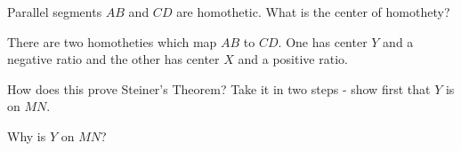 








Parallel segments $AB$ and $CD$ are homothetic. What is the center of homothety?








There are two homotheties which map $AB$ to $CD$. One has center $Y$ and a negative ratio and the other has center $X$ and a positive ratio.

How does this prove Steiner's Theorem?  Take it in two steps - show first that $Y$ is on $MN$.

Why is $Y$ on $MN$?



